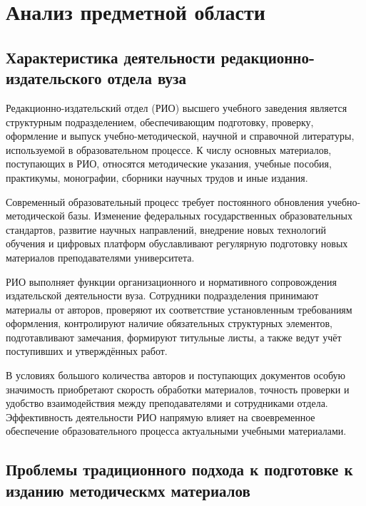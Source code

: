 \section{Анализ предметной области}

\subsection{Характеристика деятельности редакционно-издательского отдела вуза}

Редакционно-издательский отдел (РИО) высшего учебного заведения является структурным подразделением, обеспечивающим подготовку, проверку, оформление и выпуск учебно-методической, научной и справочной литературы, используемой в образовательном процессе. К числу основных материалов, поступающих в РИО, относятся методические указания, учебные пособия, практикумы, монографии, сборники научных трудов и иные издания.

Современный образовательный процесс требует постоянного обновления учебно-методической базы. Изменение федеральных государственных образовательных стандартов, развитие научных направлений, внедрение новых технологий обучения и цифровых платформ обуславливают регулярную подготовку новых материалов преподавателями университета.

РИО выполняет функции организационного и нормативного сопровождения издательской деятельности вуза. Сотрудники подразделения принимают материалы от авторов, проверяют их соответствие установленным требованиям оформления, контролируют наличие обязательных структурных элементов, подготавливают замечания, формируют титульные листы, а также ведут учёт поступивших и утверждённых работ.

В условиях большого количества авторов и поступающих документов особую значимость приобретают скорость обработки материалов, точность проверки и удобство взаимодействия между преподавателями и сотрудниками отдела. Эффективность деятельности РИО напрямую влияет на своевременное обеспечение образовательного процесса актуальными учебными материалами.

\subsection{Проблемы традиционного подхода к подготовке к изданию методическмх материалов}

